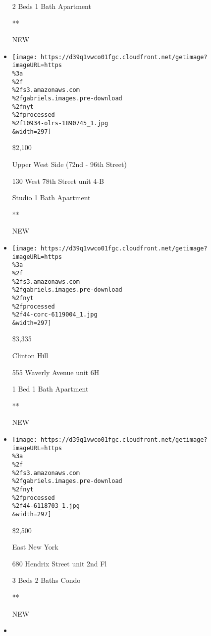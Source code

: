\begin{itemize}
  2 Beds \textbar{} 1 Bath \textbar{} Apartment

  **

  NEW
\item
  \href{/real-estate/usa/ny/new-york/upper-west-side-72nd---96th-street/homes-for-rent/130-west-78th-street/10934-OLRS-1890745?}{}

  \texttt{[image: https://d39q1vwco01fgc.cloudfront.net/getimage?imageURL=https\\\%3a\\\%2f\\\%2fs3.amazonaws.com\\\%2fgabriels.images.pre-download\\\%2fnyt\\\%2fprocessed\\\%2f10934-olrs-1890745\_1.jpg\\\&width=297]}

  \$2,100

  Upper West Side (72nd - 96th Street)

  130 West 78th Street unit 4-B

  Studio \textbar{} 1 Bath \textbar{} Apartment

  **

  NEW
\item
  \href{/real-estate/usa/ny/brooklyn/clinton-hill/homes-for-rent/555-waverly-avenue/44-CORC-6119004?}{}

  \texttt{[image: https://d39q1vwco01fgc.cloudfront.net/getimage?imageURL=https\\\%3a\\\%2f\\\%2fs3.amazonaws.com\\\%2fgabriels.images.pre-download\\\%2fnyt\\\%2fprocessed\\\%2f44-corc-6119004\_1.jpg\\\&width=297]}

  \$3,335

  Clinton Hill

  555 Waverly Avenue unit 6H

  1 Bed \textbar{} 1 Bath \textbar{} Apartment

  **

  NEW
\item
  \href{/real-estate/usa/ny/brooklyn/east-new-york/homes-for-rent/680-hendrix-street/44-6118703?}{}

  \texttt{[image: https://d39q1vwco01fgc.cloudfront.net/getimage?imageURL=https\\\%3a\\\%2f\\\%2fs3.amazonaws.com\\\%2fgabriels.images.pre-download\\\%2fnyt\\\%2fprocessed\\\%2f44-6118703\_1.jpg\\\&width=297]}

  \$2,500

  East New York

  680 Hendrix Street unit 2nd Fl

  3 Beds \textbar{} 2 Baths \textbar{} Condo

  **

  NEW
\item
  \href{/real-estate/usa/ny/new-york/upper-east-side/homes-for-rent/301-east-66th-street/44-CORC-6113675?}{}


\end{itemize}
